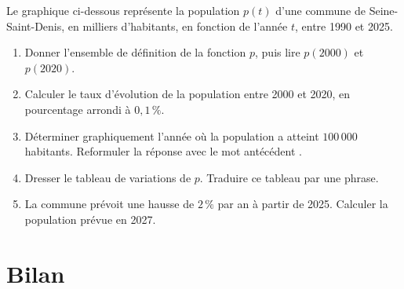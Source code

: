\documentclass[10pt,a4paper]{article}
\begin{document}
\begin{bloc}
\begin{exo}
Le graphique ci-dessous représente la population \(p(t)\) d'une commune de Seine-Saint-Denis, en milliers d'habitants, en fonction de l'année \(t\), entre 1990 et 2025.

\begin{center}
\end{center}

\begin{enumerate}[leftmargin=*]
    \item Donner l'ensemble de définition de la fonction \(p\), puis lire \(p(2000)\) et \(p(2020)\).
    \item Calculer le taux d'évolution de la population entre 2000 et 2020, en pourcentage arrondi à \(0,1\,\%\).
    \item Déterminer graphiquement l'année où la population a atteint \(100\,000\) habitants. Reformuler la réponse avec le mot \og antécédent \fg{}.
    \item Dresser le tableau de variations de \(p\). Traduire ce tableau par une phrase.
    \item La commune prévoit une hausse de \(2\,\%\) par an à partir de 2025. Calculer la population prévue en 2027.
\end{enumerate}
\end{exo}
\end{bloc}


\section{Bilan}
\end{document}
